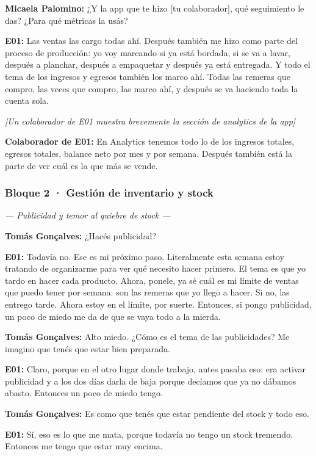 \noindent\textbf{Micaela Palomino:} ¿Y la app que te hizo [tu colaborador], qué seguimiento le das? ¿Para qué métricas la usás?

\noindent\textbf{E01:} Las ventas las cargo todas ahí. Después también me hizo como parte del proceso de producción: yo voy marcando si ya está bordada, si se va a lavar, después a planchar, después a empaquetar y después ya está entregada. Y todo el tema de los ingresos y egresos también los marco ahí. Todas las remeras que compro, las veces que compro, las marco ahí, y después se va haciendo toda la cuenta sola.

\noindent\textit{[Un colaborador de E01 muestra brevemente la sección de analytics de la app]}

\noindent\textbf{Colaborador de E01:} En Analytics tenemos todo lo de los ingresos totales, egresos totales, balance neto por mes y por semana. Después también está la parte de ver cuál es la que más se vende.

\subsubsection*{Bloque 2 · Gestión de inventario y stock}

\noindent\textit{--- Publicidad y temor al quiebre de stock ---}

\noindent\textbf{Tomás Gonçalves:} ¿Hacés publicidad?

\noindent\textbf{E01:} Todavía no. Ese es mi próximo paso. Literalmente esta semana estoy tratando de organizarme para ver qué necesito hacer primero. El tema es que yo tardo en hacer cada producto. Ahora, ponele, ya sé cuál es mi límite de ventas que puedo tener por semana: son las remeras que yo llego a hacer. Si no, las entrego tarde. Ahora estoy en el límite, por suerte. Entonces, si pongo publicidad, un poco de miedo me da de que se vaya todo a la mierda.

\noindent\textbf{Tomás Gonçalves:} Alto miedo. ¿Cómo es el tema de las publicidades? Me imagino que tenés que estar bien preparada.

\noindent\textbf{E01:} Claro, porque en el otro lugar donde trabajo, antes pasaba eso: era activar publicidad y a los dos días darla de baja porque decíamos que ya no dábamos abasto. Entonces un poco de miedo tengo.

\noindent\textbf{Tomás Gonçalves:} Es como que tenés que estar pendiente del stock y todo eso.

\noindent\textbf{E01:} Sí, eso es lo que me mata, porque todavía no tengo un stock tremendo. Entonces me tengo que estar muy encima.

